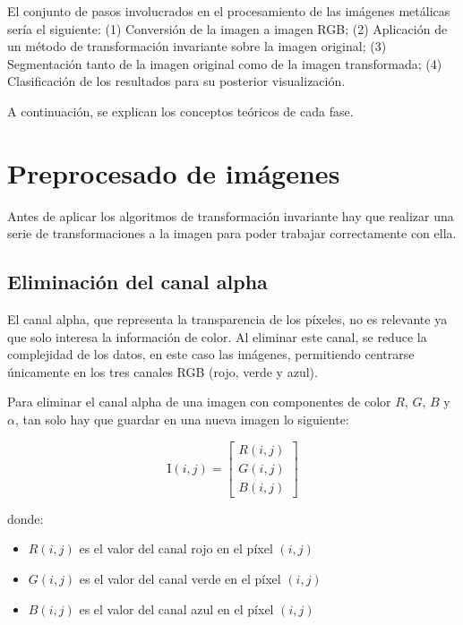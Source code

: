 
El conjunto de pasos involucrados en el procesamiento de las imágenes metálicas sería el siguiente: (1) Conversión de la imagen a imagen RGB; (2) Aplicación de un método de transformación invariante sobre la imagen original; (3) Segmentación tanto de la imagen original como de la imagen transformada; (4) Clasificación de los resultados para su posterior visualización.

A continuación, se explican los conceptos teóricos de cada fase.

\section{Preprocesado de imágenes}\label{preprocesado}

Antes de aplicar los algoritmos de transformación invariante hay que realizar una serie de transformaciones a la imagen para poder trabajar correctamente con ella.

\subsection{Eliminación del canal alpha}\label{eliminación-del-canal-alpha}

El canal alpha, que representa la transparencia de los píxeles, no es relevante ya que solo interesa la información de color. Al eliminar este canal, se reduce la complejidad de los datos, en este caso las imágenes, permitiendo centrarse únicamente en los tres canales RGB (rojo, verde y azul).

Para eliminar el canal alpha de una imagen con componentes de color $R$, $G$, $B$ y $\alpha$, tan solo hay que guardar en una nueva imagen lo siguiente:

$$\text{I}(i, j) = 
\begin{bmatrix} R(i, j) \\ G(i, j) \\ B(i, j)\end{bmatrix}$$

donde:

\begin{itemize}
  \item $R(i, j)$ es el valor del canal rojo en el píxel $(i, j)$
  \item $G(i, j)$ es el valor del canal verde en el píxel $(i, j)$
  \item $B(i, j)$ es el valor del canal azul en el píxel $(i, j)$
\end{itemize}

